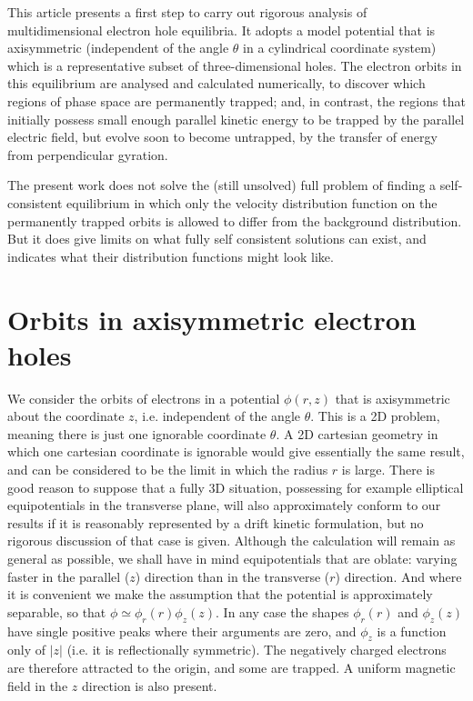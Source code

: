 \documentclass{agujournal2019}
\begin{document}
This article presents a first step to carry out rigorous analysis of
multidimensional electron hole equilibria. It adopts a model potential
that is axisymmetric (independent of the angle $\theta$ in a
cylindrical coordinate system) which is a representative subset of
three-dimensional holes. The electron orbits in this equilibrium are
analysed and calculated numerically, to discover which regions of phase
space are permanently trapped; and, in contrast, the regions that
initially possess small enough parallel kinetic energy to be trapped
by the parallel electric field, but evolve soon to become untrapped, by
the transfer of energy from perpendicular gyration. 

The present work does not solve the (still unsolved) full problem of
finding a self-consistent equilibrium in which only the velocity
distribution function on the permanently trapped orbits is allowed to
differ from the background distribution. But it does give limits on
what fully self consistent solutions can exist, and indicates what
their distribution functions might look like.

\section{Orbits in axisymmetric electron holes}

We consider the orbits of electrons in a potential $\phi(r,z)$ that is
axisymmetric about the coordinate $z$, i.e. independent of the angle
$\theta$. This is a 2D problem, meaning there is just one ignorable
coordinate $\theta$. A 2D cartesian geometry in which one cartesian
coordinate is ignorable would give essentially the same result, and
can be considered to be the limit in which the radius $r$ is large. There
is good reason to suppose that a fully 3D situation, possessing for
example elliptical equipotentials in the transverse plane, will also
approximately conform to our results if it is reasonably represented
by a drift kinetic formulation, but no rigorous discussion of that
case is given. Although the calculation will remain as general as
possible, we shall have in mind equipotentials that are oblate:
varying faster in the parallel ($z$) direction than in the transverse
($r$) direction. And where it is convenient we make the assumption
that the potential is approximately separable, so that
$\phi\simeq \phi_r(r)\phi_z(z)$. In any case the shapes $\phi_r(r)$
and $\phi_z(z)$ have single positive peaks where their arguments are
zero, and $\phi_z$ is a function only of $|z|$ (i.e. it is
reflectionally symmetric). The negatively charged electrons are
therefore attracted to the origin, and some are trapped. A uniform
magnetic field in the $z$ direction is also present.
\end{document}
